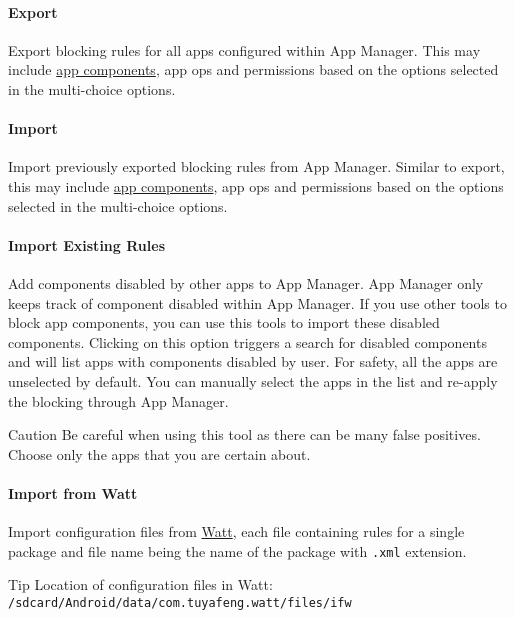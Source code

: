 
\paragraph{Export} Export blocking rules for all apps configured within App Manager.
This may include \hyperref[subsec:faq:what-are-app-components]{app components}, app ops and permissions based on the
options selected in the multi-choice options.

\paragraph{Import} Import previously exported blocking rules from App Manager.
Similar to export, this may include \hyperref[subsec:faq:what-are-app-components]{app components}, app ops and
permissions based on the options selected in the multi-choice options.

\paragraph{Import Existing Rules}\label{par:import-existing-rules}
Add components disabled by other apps to App Manager.
App Manager only keeps track of component disabled within App Manager.
If you use other tools to block app components, you can use this tools to import these disabled components.
Clicking on this option triggers a search for disabled components and will list apps with components disabled by user.
For safety, all the apps are unselected by default.
You can manually select the apps in the list and re-apply the blocking through App Manager.

\begin{danger}{Caution}
    Be careful when using this tool as there can be many false positives.
    Choose only the apps that you are certain about.
\end{danger}

\paragraph{Import from Watt} Import configuration files from \href{https://github.com/tuyafeng/Watt}{Watt}, each file
containing rules for a single package and file name being the name of the package with \texttt{.xml} extension.

\begin{tip}{Tip}
    Location of configuration files in Watt: \texttt{/sdcard/Android/data/com.tuyafeng.watt/files/ifw}
\end{tip}

